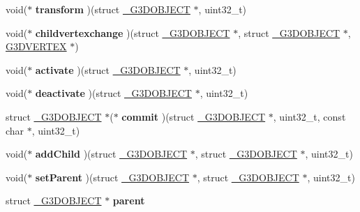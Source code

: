 \begin{DoxyCompactItemize}
void($\ast$ {\bfseries transform} )(struct \hyperlink{struct__G3DOBJECT}{\+\_\+\+G3\+D\+O\+B\+J\+E\+CT} $\ast$, uint32\+\_\+t)
\item 
\mbox{\label{struct__G3DOBJECT_a497910eb833fb2a25a1866972d00aeeb}} 
void($\ast$ {\bfseries childvertexchange} )(struct \hyperlink{struct__G3DOBJECT}{\+\_\+\+G3\+D\+O\+B\+J\+E\+CT} $\ast$, struct \hyperlink{struct__G3DOBJECT}{\+\_\+\+G3\+D\+O\+B\+J\+E\+CT} $\ast$, \hyperlink{struct__G3DVERTEX}{G3\+D\+V\+E\+R\+T\+EX} $\ast$)
\item 
\mbox{\label{struct__G3DOBJECT_a2f640213c6f5b28d579b06bd1648ef8d}} 
void($\ast$ {\bfseries activate} )(struct \hyperlink{struct__G3DOBJECT}{\+\_\+\+G3\+D\+O\+B\+J\+E\+CT} $\ast$, uint32\+\_\+t)
\item 
\mbox{\label{struct__G3DOBJECT_a5c9ed01a59792190db5acea40400aa52}} 
void($\ast$ {\bfseries deactivate} )(struct \hyperlink{struct__G3DOBJECT}{\+\_\+\+G3\+D\+O\+B\+J\+E\+CT} $\ast$, uint32\+\_\+t)
\item 
\mbox{\label{struct__G3DOBJECT_a56535f4282fa2cbade3a3709286f6413}} 
struct \hyperlink{struct__G3DOBJECT}{\+\_\+\+G3\+D\+O\+B\+J\+E\+CT} $\ast$($\ast$ {\bfseries commit} )(struct \hyperlink{struct__G3DOBJECT}{\+\_\+\+G3\+D\+O\+B\+J\+E\+CT} $\ast$, uint32\+\_\+t, const char $\ast$, uint32\+\_\+t)
\item 
\mbox{\label{struct__G3DOBJECT_a42cd4321e468bdc58c548c3111a9cbce}} 
void($\ast$ {\bfseries add\+Child} )(struct \hyperlink{struct__G3DOBJECT}{\+\_\+\+G3\+D\+O\+B\+J\+E\+CT} $\ast$, struct \hyperlink{struct__G3DOBJECT}{\+\_\+\+G3\+D\+O\+B\+J\+E\+CT} $\ast$, uint32\+\_\+t)
\item 
\mbox{\label{struct__G3DOBJECT_a218040a640bd7ec6b68e8062332fac23}} 
void($\ast$ {\bfseries set\+Parent} )(struct \hyperlink{struct__G3DOBJECT}{\+\_\+\+G3\+D\+O\+B\+J\+E\+CT} $\ast$, struct \hyperlink{struct__G3DOBJECT}{\+\_\+\+G3\+D\+O\+B\+J\+E\+CT} $\ast$, uint32\+\_\+t)
\item 
\mbox{\label{struct__G3DOBJECT_a598149d5a2094a627f544b9e98f76121}} 
struct \hyperlink{struct__G3DOBJECT}{\+\_\+\+G3\+D\+O\+B\+J\+E\+CT} $\ast$ {\bfseries parent}

\end{DoxyCompactItemize}
